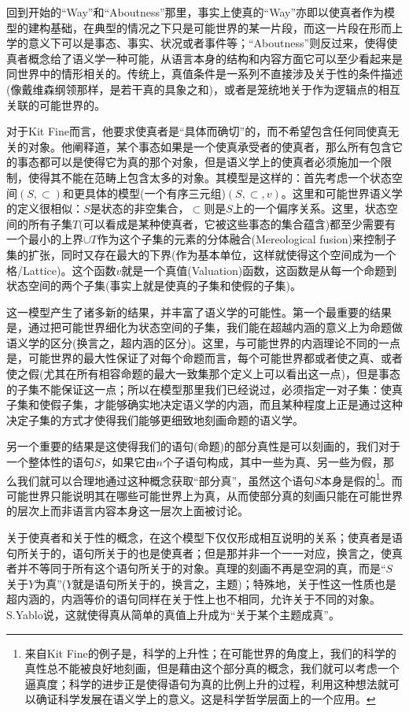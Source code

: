 \documentclass{article}
\begin{document}
回到开始的“Way”和“Aboutness”那里，事实上使真的“Way”亦即以使真者作为模型的建构基础，在典型的情况之下只是可能世界的某一片段，而这一片段在形而上学的意义下可以是事态、事实、状况或者事件等；“Aboutness”则反过来，使得使真者概念给了语义学一种可能，从语言本身的结构和内容方面它可以至少看起来是同世界中的情形相关的。传统上，真值条件是一系列不直接涉及关于性的条件描述(像戴维森纲领那样，是若干真的具象之和)，或者是笼统地关于作为逻辑点的相互关联的可能世界的。

对于Kit Fine而言，他要求使真者是“具体而确切”的，而不希望包含任何同使真无关的对象。他阐释道，某个事态如果是一个使真承受者的使真者，那么所有包含它的事态都可以是使得它为真的那个对象，但是语义学上的使真者必须施加一个限制，使得其不能在范畴上包含太多的对象。其模型是这样的：首先考虑一个状态空间$(S,\subset)$和更具体的模型(一个有序三元组)$(S,\subset,v)$。这里和可能世界语义学的定义很相似：$S$是状态的非空集合，$\subset$则是$S$上的一个偏序关系。这里，状态空间的所有子集$T$(可以看成是某种使真者，它被这些事态的集合蕴含)都至少需要有一个最小的上界$\cup T$作为这个子集的元素的分体融合(Mereological fusion)来控制子集的扩张，同时又存在最大的下界(作为基本单位，这样就使得这个空间成为一个格/Lattice)。这个函数$v$就是一个真值(Valuation)函数，这函数是从每一个命题到状态空间的两个子集(事实上就是使真的子集和使假的子集)。

这一模型产生了诸多新的结果，并丰富了语义学的可能性。第一个最重要的结果是，通过把可能世界细化为状态空间的子集，我们能在超越内涵的意义上为命题做语义学的区分(换言之，超内涵的区分)。这里，与可能世界的内涵理论不同的一点是，可能世界的最大性保证了对每个命题而言，每个可能世界都或者使之真、或者使之假(尤其在所有相容命题的最大一致集那个定义上可以看出这一点)，但是事态的子集不能保证这一点；所以在模型那里我们已经说过，必须指定一对子集：使真子集和使假子集，才能够确实地决定语义学的内涵，而且某种程度上正是通过这种决定子集的方式才使得我们能够更细致地刻画命题的语义学。

另一个重要的结果是这使得我们的语句(命题)的部分真性是可以刻画的，我们对于一个整体性的语句$S$，如果它由$n$个子语句构成，其中一些为真、另一些为假，那么我们就可以合理地通过这种概念获取“部分真”，虽然这个语句$S$本身是假的\footnote{来自Kit Fine的例子是，科学的上升性；在可能世界的角度上，我们的科学的真性总不能被良好地刻画，但是藉由这个部分真的概念，我们就可以考虑一个逼真度；科学的进步正是使得语句为真的比例上升的过程，利用这种想法就可以确证科学发展在语义学上的意义。这是科学哲学层面上的一个应用。}。而可能世界只能说明其在哪些可能世界上为真，从而使部分真的刻画只能在可能世界的层次上而非语言内容本身这一层次上面被讨论。

关于使真者和关于性的概念，在这个模型下仅仅形成相互说明的关系；使真者是语句所关于的，语句所关于的也是使真者；但是那并非一个一一对应，换言之，使真者并不等同于所有这个语句所关于的对象。真理的刻画不再是空洞的真，而是“$S$关于$Y$为真”($Y$就是语句所关于的，换言之，主题)；特殊地，关于性这一性质也是超内涵的，内涵等价的语句同样在关于性上也不相同，允许关于不同的对象。S.Yablo说，这就使得真从简单的真值上升成为“关于某个主题成真”。
\end{document}
